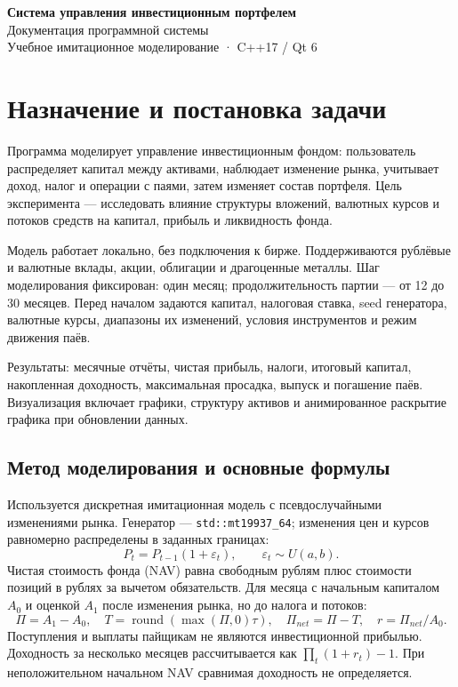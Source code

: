\documentclass[11pt,a4paper]{article}
\newcommand{\code}[1]{\texttt{#1}}
\begin{document}
\sloppy
\begin{center}
{\Large\bfseries Система управления инвестиционным портфелем}\\[5pt]
{\large Документация программной системы}\\[3pt]
Учебное имитационное моделирование · C++17 / Qt 6
\end{center}

\section{Назначение и постановка задачи}
Программа моделирует управление инвестиционным фондом: пользователь распределяет капитал между активами, наблюдает изменение рынка, учитывает доход, налог и операции с паями, затем изменяет состав портфеля. Цель эксперимента --- исследовать влияние структуры вложений, валютных курсов и потоков средств на капитал, прибыль и ликвидность фонда.

Модель работает локально, без подключения к бирже. Поддерживаются рублёвые и валютные вклады, акции, облигации и драгоценные металлы. Шаг моделирования фиксирован: один месяц; продолжительность партии --- от 12 до 30 месяцев. Перед началом задаются капитал, налоговая ставка, seed генератора, валютные курсы, диапазоны их изменений, условия инструментов и режим движения паёв.

Результаты: месячные отчёты, чистая прибыль, налоги, итоговый капитал, накопленная доходность, максимальная просадка, выпуск и погашение паёв. Визуализация включает графики, структуру активов и анимированное раскрытие графика при обновлении данных.

\subsection*{Метод моделирования и основные формулы}
Используется дискретная имитационная модель с псевдослучайными изменениями рынка. Генератор --- \code{std::mt19937\_64}; изменения цен и курсов равномерно распределены в заданных границах:
\[
 P_t=P_{t-1}(1+\varepsilon_t),\qquad \varepsilon_t\sim U(a,b).
\]
Чистая стоимость фонда (NAV) равна свободным рублям плюс стоимости позиций в рублях за вычетом обязательств. Для месяца с начальным капиталом $A_0$ и оценкой $A_1$ после изменения рынка, но до налога и потоков:
\[
 \Pi=A_1-A_0,\quad T=\operatorname{round}(\max(\Pi,0)\tau),\quad
 \Pi_{net}=\Pi-T,\quad r=\Pi_{net}/A_0.
\]
Поступления и выплаты пайщикам не являются инвестиционной прибылью. Доходность за несколько месяцев рассчитывается как $\prod_t(1+r_t)-1$. При неположительном начальном NAV сравнимая доходность не определяется.
\end{document}
